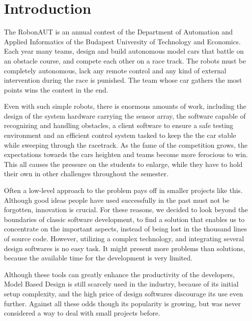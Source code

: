 \section{Introduction}
\label{sec:Introduction}


The RobonAUT is an annual contest of the Department of Automation and Applied Informatics of the Budapest University of Technology and Economics. Each year many teams, design and build autonomous model cars that battle on an obstacle course, and compete each other on a race track. The robots must be completely autonomous, lack any remote control and any kind of external intervention during the race is punished. The team whose car gathers the most points wins the contest in the end\cite{rules}.


Even with such simple robots, there is enormous amounts of work, including the design of the system hardware carrying the sensor array, the software capable of recognizing and handling obstacles, a client software to ensure a safe testing environment and an efficient control system tasked to keep the the car stable while sweeping through the racetrack. As the fame of the competition grows, the expectations towards the cars heighten and teams become more ferocious to win. This all causes the pressure on the students to enlarge, while they have to hold their own in other challenges throughout the semester.


Often a low-level approach to the problem pays off in smaller projects like this. Although good ideas people have used successfully in the past must not be forgotten, innovation is crucial. For these reasons, we decided to look beyond the boundaries of classic software development, to find a solution that enables us to concentrate on the important aspects, instead of being lost in the thousand lines of source code. However, utilizing a complex technology, and integrating several design softwares is no easy task. It might present more problems than solutions, because the available time for the development is very limited.


Although these tools can greatly enhance the productivity of the developers, Model Based Design is still scarcely used in the industry, because of its initial setup complexity, and the high price of design softwares discourage its use even further. Against all these odds though its popularity is growing, but was never considered a way to deal with small projects before.

